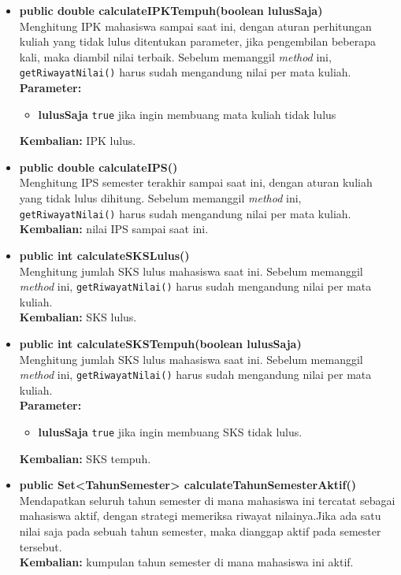 \begin{enumerate}
\begin{itemize}
\begin{itemize}
								\item \textbf{public double calculateIPKTempuh(boolean lulusSaja)}\\
						Menghitung IPK mahasiswa sampai saat ini, dengan aturan perhitungan kuliah yang tidak lulus ditentukan parameter, jika pengembilan beberapa kali, maka diambil nilai terbaik. Sebelum memanggil \textit{method} ini, \texttt{getRiwayatNilai()} harus sudah mengandung nilai per mata kuliah.\\
						\textbf{Parameter:} 
						\begin{itemize}
							\item \textbf{lulusSaja} \texttt{true} jika ingin membuang mata kuliah tidak lulus
						\end{itemize}
						\textbf{Kembalian:}  IPK lulus.
					
					\item \textbf{public double calculateIPS()}\\
						Menghitung IPS semester terakhir sampai saat ini, dengan aturan kuliah yang tidak lulus dihitung. Sebelum memanggil \textit{method} ini, \texttt{getRiwayatNilai()} harus sudah mengandung nilai per mata kuliah.\\
						\textbf{Kembalian:}  nilai IPS sampai saat ini.
						
					\item \textbf{public int calculateSKSLulus()}\\
						Menghitung jumlah SKS lulus mahasiswa saat ini. Sebelum memanggil \textit{method} ini, \texttt{getRiwayatNilai()} harus sudah mengandung nilai per mata kuliah.\\
						\textbf{Kembalian:} SKS lulus.
					
					\item \textbf{public int calculateSKSTempuh(boolean lulusSaja)}\\
						Menghitung jumlah SKS lulus mahasiswa saat ini. Sebelum memanggil \textit{method} ini, \texttt{getRiwayatNilai()} harus sudah mengandung nilai per mata kuliah.\\
						\textbf{Parameter:} 
						\begin{itemize}
							\item \textbf{lulusSaja} \texttt{true} jika ingin membuang SKS tidak lulus.
						\end{itemize}
						\textbf{Kembalian:} SKS tempuh.
						
					\item \textbf{public Set<TahunSemester> calculateTahunSemesterAktif()}\\
						Mendapatkan seluruh tahun semester di mana mahasiswa ini tercatat sebagai mahasiswa aktif, dengan strategi memeriksa riwayat nilainya.Jika ada satu nilai saja pada sebuah tahun semester, maka dianggap aktif pada semester tersebut.\\
						\textbf{Kembalian:} kumpulan tahun semester di mana mahasiswa ini aktif.
					

\end{itemize}
\end{itemize}
\end{enumerate}

